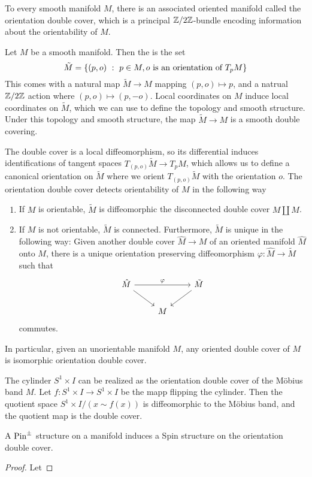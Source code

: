 %
To every smooth manifold $M$, there is an associated oriented manifold called the
orientation double cover, which is a principal $\mathbb{Z}/2\mathbb{Z}$-bundle encoding
information about the orientability of $M$.
%
\begin{defn}
Let $M$ be a smooth manifold. Then the  is the set
\[
\tilde{M} = \left\lbrace (p, o) ~:~ p \in M, o \text{ is an orientation of } T_pM \right\rbrace
\]
This comes with a natural map $\tilde{M} \to M$ mapping $(p,o) \mapsto p$,
and a natrual $\mathbb{Z}/2\mathbb{Z}$ action where $(p,o) \mapsto (p,-o)$. Local coordinates
on $M$ induce local coordinates on $\tilde{M}$, which we can use to define the
topology and smooth structure. Under this topology and smooth structure, the
map $\tilde{M} \to M$ is a smooth double covering.
\end{defn}
%
The double cover is a local diffeomorphism, so its differential induces
identifications of tangent spaces $T_{(p,o)}\tilde{M} \to T_pM$, which allows
us to define a canonical orientation on $\tilde{M}$ where we orient
$T_{(p,o)}\tilde{M}$ with the orientation $o$. The orientation double cover
detects orientability of $M$ in the following way
%
\begin{thm} \enumbreak
\begin{enumerate}
  \item If $M$ is orientable, $\tilde{M}$ is diffeomorphic the disconnected
  double cover $M \coprod M$.
  \item If $M$ is not orientable, $\tilde{M}$ is connected. Furthermore,
  $\tilde{M}$ is unique in the following way: Given another double cover
  $\hat{M} \to M$ of an oriented manifold $\hat{M}$ onto $M$, there is a unique
  orientation preserving diffeomorphism $\varphi : \hat{M} \to \tilde{M}$ such
  that
  \[\begin{tikzcd}
  \hat{M} \ar[dr]\ar[rr, "\varphi"] && \tilde{M}\ar[dl] \\
   & M
  \end{tikzcd}\]
  commutes.
\end{enumerate}
\end{thm}
%
In particular, given an unorientable manifold $M$, any oriented double
cover of $M$ is isomorphic orientation double cover.
%
\begin{exmp}
The cylinder $S^1 \times I$ can be realized as the orientation double
cover of the M\"obius band $M$. Let $f : S^1 \times I \to S^1 \times I$ be the
mapp flipping the cylinder. Then the quotient space $S^1 \times I / (x \sim f(x))$
is diffeomorphic to the M\"obius band, and the quotient map is the double cover.
\end{exmp}
%
\begin{thm}
A $\mathrm{Pin}^\pm$ structure on a manifold induces a Spin structure on the orientation
double cover.
\end{thm}
%
\begin{proof}
Let 
\end{proof}
%